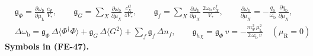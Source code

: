 \documentclass[
  10pt,
]{article}
\begin{document}
\[
\begin{aligned}
&\mathfrak{g}_{\Phi} = \frac{\partial\omega_{\mathrm{b}}}{\partial\mu_{\mathrm{L}}}\,\frac{c_\Phi}{V_*},\qquad
 \mathfrak{g}_{G} = \sum_X\frac{\partial\omega_{\mathrm{b}}}{\partial\mu_X}\,\frac{c^{G}_X}{4V_*},\qquad
 \mathfrak{g}_{f} = \sum_X\frac{\partial\omega_{\mathrm{b}}}{\partial\mu_X}\,\frac{2\omega_{\mathrm{b}}\,c^{f}_X}{V_*},\qquad
 \frac{\partial\omega_{\mathrm{b}}}{\partial\mu_X} = -\frac{q_{\mathrm{b}}}{\omega_{\mathrm{b}}}\,\frac{\partial q_{\mathrm{b}}}{\partial\mu_X},\\
&\Delta\omega_{\mathrm{b}} = \mathfrak{g}_{\Phi}\,\Delta\langle\Phi^\dagger\Phi\rangle + \mathfrak{g}_{G}\,\Delta\langle G^2\rangle + \sum_f\mathfrak{g}_{f}\,\Delta n_f,\qquad
 \mathfrak{g}_{h\chi} = \mathfrak{g}_{\Phi}\,v = -\frac{m_\Psi^2\,\mu_{\mathrm{L}}^2}{2\,\omega_{\mathrm{b}}\,v}\quad(\mu_{\mathrm{R}} = 0)
\end{aligned} \tag{FE-47}
\] \textbf{Symbols in (FE-47).}
\end{document}
